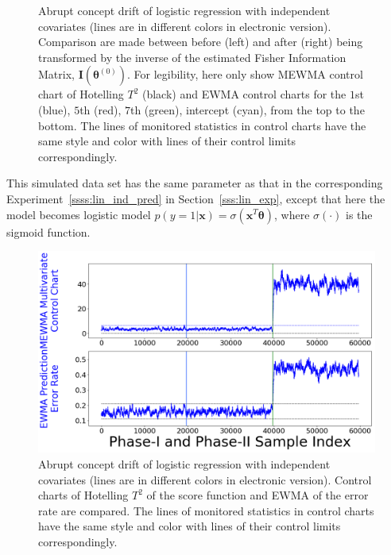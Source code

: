 \documentclass[twoside,11pt]{article}
\begin{document}
\begin{enumerate}[(I)]
\begin{figure}[!htbp]
  \caption{Abrupt concept drift of logistic regression with independent {covariates} (lines are in different colors in electronic version). Comparison are made between before (left) and after (right) being transformed by {the inverse of the estimated} Fisher Information Matrix, {$\mathbf {I} ( {\bm{\theta}} ^{(0)})$.} For legibility, here only show MEWMA control chart of Hotelling $T^2$ (black) and EWMA control charts for the $1$st (blue), $5$th (red), $7$th (green), intercept (cyan), from the top to the bottom. The lines of monitored statistics in control charts have the same style and color with lines of their control limits correspondingly.}
  \label{fig:log_reg_ind_X}
\end{figure}

This simulated data set has the same parameter as that in the corresponding Experiment~\ref{ssss:lin_ind_pred} in Section~\ref{sss:lin_exp}, except that here the model becomes {logistic model} {$p(y=1|\bm {x})= \sigma (\bm {x}^T\bm { \theta})$,} where $\sigma (\cdot)$ is the sigmoid function.
\begin{figure}[!htbp]
\centering
\includegraphics[width = 0.6\linewidth]{../figures/v14/sim_5/logi_no_muco/1_sim5_logi_1e-08_0_005_1.png}
  \caption{Abrupt concept drift of logistic regression with independent covariates (lines are in different colors in electronic version). Control charts of Hotelling $T^2$ of the score function and EWMA of the error rate are compared. The lines of monitored statistics in control charts have the same style and color with lines of their control limits correspondingly.}
  \label{fig:log_reg_ind_X_comp}
\end{figure}


\end{enumerate}
\end{document}
